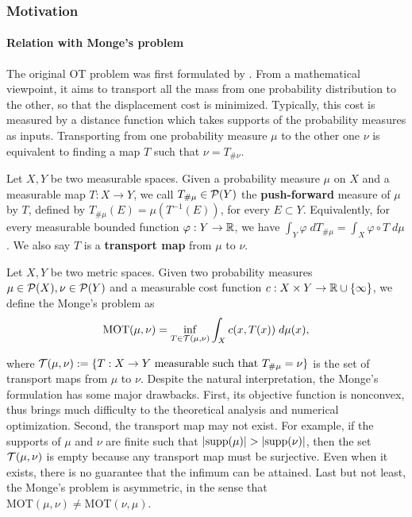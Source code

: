 \subsubsection{Motivation} \label{subsec:ot_motiv}

\paragraph{Relation with Monge's problem}
The original OT problem was first formulated by \citep{Monge81}. From a mathematical viewpoint,
it aims to transport all the mass from one probability distribution to the other, so that
the displacement cost is minimized. Typically, this cost is measured by a distance function which
takes supports of the probability measures as inputs. Transporting from one probability measure
$\mu$ to the other one $\nu$ is equivalent to finding a map $T$ such that $\nu = T_{\# \nu}$.
\begin{definition}
  Let $X, Y$ be two measurable spaces. Given a probability measure $\mu$ on $X$ and a
  measurable map $T: X \to Y$, we call $T_{\# \mu} \in \mathcal P(Y)$ the \textbf{push-forward} measure of
  $\mu$ by $T$, defined by $T_{\# \mu}(E) = \mu(T^{-1}(E))$, for every $E \subset Y$. Equivalently,
  for every measurable bounded function $\varphi: Y \to \mathbb R$, we have
  $\int_Y \varphi \; d T_{\# \mu} = \int_X \varphi \circ T \; d\mu$.
  We also say $T$ is a \textbf{transport map} from $\mu$ to $\nu$.
\end{definition}
\begin{definition}
  Let $X, Y$ be two metric spaces. Given two probability measures $\mu \in \mathcal P(X), \nu \in \mathcal P(Y)$
  and a measurable cost function $c: X \times Y \to \mathbb R \cup \{\infty\}$,
  we define the Monge's problem as
  \begin{align}
    \text{MOT}(\mu, \nu) = \inf_{T \in \mathcal T(\mu, \nu)} \int_X c(x, T(x)) \; d\mu(x),
  \end{align}
\end{definition}
where $\mathcal T(\mu, \nu) := \{T: X \to Y \text{ measurable such that } T_{\# \mu}= \nu \}$ is the
set of transport maps from $\mu$ to $\nu$.
Despite the natural interpretation, the Monge's formulation has some major drawbacks.
First, its objective function is nonconvex,
thus brings much difficulty to the theoretical analysis and numerical optimization.
Second, the transport map may not exist.
For example, if the supports of $\mu$ and $\nu$ are finite such that $|\text{supp}(\mu)| > |\text{supp}(\nu)|$,
then the set $\mathcal T(\mu, \nu)$ is empty because any transport map must be surjective.
Even when it exists, there is no guarantee that the infimum can be attained.
Last but not least, the Monge's problem is asymmetric,
in the sense that $\text{MOT}(\mu, \nu) \neq \text{MOT}(\nu, \mu)$.

